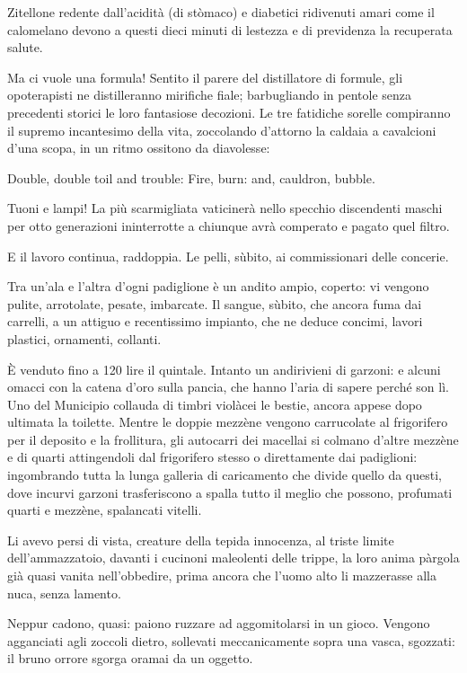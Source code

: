 Zitellone redente dall’acidità (di stòmaco) e diabetici ridivenuti amari come il calomelano devono a questi dieci minuti di lestezza e di previdenza la recuperata salute.

Ma ci vuole una formula! Sentito il parere del distillatore di formule, gli opoterapisti ne distilleranno mirifiche fiale; barbugliando in pentole senza precedenti storici le loro fantasiose decozioni. Le tre fatidiche sorelle compiranno il supremo incantesimo della vita, zoccolando d’attorno la caldaia a cavalcioni d’una scopa, in un ritmo ossitono da diavolesse:

Double, double toil and trouble:
Fire, burn: and, cauldron, bubble.

Tuoni e lampi! La più scarmigliata vaticinerà nello specchio discendenti maschi per otto generazioni ininterrotte a chiunque avrà comperato e pagato quel filtro.

E il lavoro continua, raddoppia. Le pelli, sùbito, ai commissionari delle concerie.

Tra un’ala e l’altra d’ogni padiglione è un andito ampio, coperto: vi vengono pulite, arrotolate, pesate, imbarcate. Il sangue, sùbito, che ancora fuma dai carrelli, a un attiguo e recentissimo impianto, che ne deduce concimi, lavori plastici, ornamenti, collanti.

È venduto fino a 120 lire il quintale. Intanto un andirivieni di garzoni: e alcuni omacci con la catena d’oro sulla pancia, che hanno l’aria di sapere perché son lì. Uno del Municipio collauda di timbri violàcei le bestie, ancora appese dopo ultimata la toilette. Mentre le doppie mezzène vengono carrucolate al frigorifero per il deposito e la frollitura, gli autocarri dei macellai si colmano d’altre mezzène e di quarti attingendoli dal frigorifero stesso o direttamente dai padiglioni: ingombrando tutta la lunga galleria di caricamento che divide quello da questi, dove incurvi garzoni trasferiscono a spalla tutto il meglio che possono, profumati quarti e mezzène, spalancati vitelli.

Li avevo persi di vista, creature della tepida innocenza, al triste limite dell’ammazzatoio, davanti i cucinoni maleolenti delle trippe, la loro anima pàrgola già quasi vanita nell’obbedire, prima ancora che l’uomo alto li mazzerasse alla nuca, senza lamento.

Neppur cadono, quasi: paiono ruzzare ad aggomitolarsi in un gioco. Vengono agganciati agli zoccoli dietro, sollevati meccanicamente sopra una vasca, sgozzati: il bruno orrore sgorga oramai da un oggetto.

